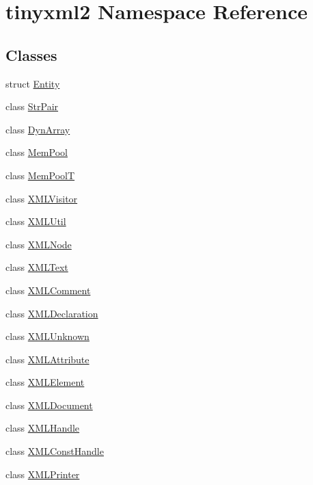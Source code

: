 \hypertarget{namespacetinyxml2}{\section{tinyxml2 Namespace Reference}
\label{namespacetinyxml2}
}
\subsection*{Classes}
\begin{DoxyCompactItemize}
\item 
struct \hyperlink{structtinyxml2_1_1_entity}{Entity}
\item 
class \hyperlink{classtinyxml2_1_1_str_pair}{Str\-Pair}
\item 
class \hyperlink{classtinyxml2_1_1_dyn_array}{Dyn\-Array}
\item 
class \hyperlink{classtinyxml2_1_1_mem_pool}{Mem\-Pool}
\item 
class \hyperlink{classtinyxml2_1_1_mem_pool_t}{Mem\-Pool\-T}
\item 
class \hyperlink{classtinyxml2_1_1_x_m_l_visitor}{X\-M\-L\-Visitor}
\item 
class \hyperlink{classtinyxml2_1_1_x_m_l_util}{X\-M\-L\-Util}
\item 
class \hyperlink{classtinyxml2_1_1_x_m_l_node}{X\-M\-L\-Node}
\item 
class \hyperlink{classtinyxml2_1_1_x_m_l_text}{X\-M\-L\-Text}
\item 
class \hyperlink{classtinyxml2_1_1_x_m_l_comment}{X\-M\-L\-Comment}
\item 
class \hyperlink{classtinyxml2_1_1_x_m_l_declaration}{X\-M\-L\-Declaration}
\item 
class \hyperlink{classtinyxml2_1_1_x_m_l_unknown}{X\-M\-L\-Unknown}
\item 
class \hyperlink{classtinyxml2_1_1_x_m_l_attribute}{X\-M\-L\-Attribute}
\item 
class \hyperlink{classtinyxml2_1_1_x_m_l_element}{X\-M\-L\-Element}
\item 
class \hyperlink{classtinyxml2_1_1_x_m_l_document}{X\-M\-L\-Document}
\item 
class \hyperlink{classtinyxml2_1_1_x_m_l_handle}{X\-M\-L\-Handle}
\item 
class \hyperlink{classtinyxml2_1_1_x_m_l_const_handle}{X\-M\-L\-Const\-Handle}
\item 
class \hyperlink{classtinyxml2_1_1_x_m_l_printer}{X\-M\-L\-Printer}
\end{DoxyCompactItemize}
